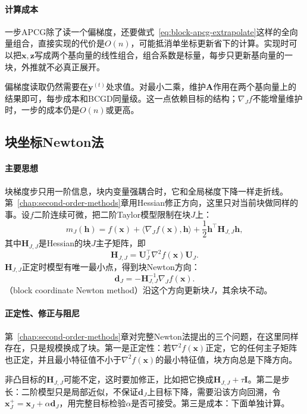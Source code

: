 \paragraph{计算成本}
一步APCG除了读一个偏梯度，还要做式~\eqref{eq:block-apcg-extrapolate}这样的全向量组合，直接实现的代价是$O(n)$，可能抵消单坐标更新省下的计算。实现时可以把$\bm{x},\bm{z}$写成两个基向量的线性组合，组合系数是标量，每步只更新基向量的一块，外推就不必真正展开。

偏梯度读取仍然需要在$\bm{y}^{(t)}$处求值。对最小二乘，维护$\bm{A}$作用在两个基向量上的结果即可，每步成本和BCGD同量级。这一点依赖目标的结构；$\nabla_Jf$不能增量维护时，一步的成本仍是$O(n)$或更高。

\subsection{块坐标Newton法}
\label{sec:block-newton}

\paragraph{主要思想}
块梯度步只用一阶信息，块内变量强耦合时，它和全局梯度下降一样走折线。第~\ref{chap:second-order-methods}章用Hessian修正方向，这里只对当前块做同样的事。设$f$二阶连续可微，把二阶Taylor模型限制在块$J$上：
\[
 m_J(\bm{h})=f(\bm{x})+\langle\nabla_Jf(\bm{x}),\bm{h}\rangle+\frac12\bm{h}^\top\bm{H}_{J,J}\bm{h},
\]
其中$\bm{H}_{J,J}$是Hessian的块$J$主子矩阵，即
\[
 \bm{H}_{J,J}=\bm{U}_J^\top\nabla^2f(\bm{x})\bm{U}_J .
\]
$\bm{H}_{J,J}$正定时模型有唯一最小点，得到块Newton方向：
\begin{equation}
 \bm{d}_J=-\bm{H}_{J,J}^{-1}\nabla_Jf(\bm{x}).
 \label{eq:block-newton}
\end{equation}
（block coordinate Newton method）沿这个方向更新块$J$，其余块不动。

\paragraph{正定性、修正与阻尼}
第~\ref{chap:second-order-methods}章对完整Newton法提出的三个问题，在这里同样存在，只是规模换成了块。第一是正定性：若$\nabla^2f(\bm{x})$正定，它的任何主子矩阵也正定，并且最小特征值不小于$\nabla^2f(\bm{x})$的最小特征值，块方向总是下降方向。

非凸目标的$\bm{H}_{J,J}$可能不定，这时要加修正，比如把它换成$\bm{H}_{J,J}+\tau\bm{I}$。第二是步长：二阶模型只是局部近似，不保证$\bm{d}_J$上目标下降，需要沿该方向回溯，令$\bm{x}_J^{+}=\bm{x}_J+\alpha\bm{d}_J$，用完整目标检验$\alpha$是否可接受。第三是成本：下面单独计算。

